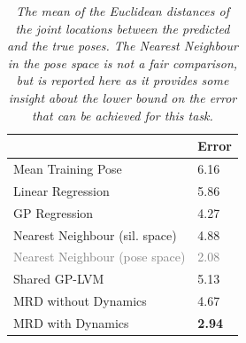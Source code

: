 \begin{table}[h]
\label{humanMotionTable}
\begin{center}
\begin{tabular}{|l|l|}
\hline
						 	   & Error \\ \hline \hline
Mean Training Pose		       & 6.16   \\ \hline
Linear Regression		       & 5.86   \\ \hline
GP Regression 			       & 4.27   \\ \hline
Nearest Neighbour (sil. space) & 4.88  \\ \hline
\textcolor{Gray}{Nearest Neighbour (pose space)} & \textcolor{Gray}{2.08}   \\ \hline
Shared GP-LVM				       & 5.13    \\ \hline
MRD	without Dynamics       & 4.67   \\ \hline
MRD with Dynamics	       & \textbf{2.94}    \\ \hline
\end{tabular}
\end{center}
\caption{
\small{ \it
The mean of the Euclidean distances of the joint locations between the predicted and the true poses.
The Nearest Neighbour in the pose space
is not a fair comparison, but is reported here as it provides some insight about the
lower bound on the error that can be achieved for this task.
}}
\end{table}








